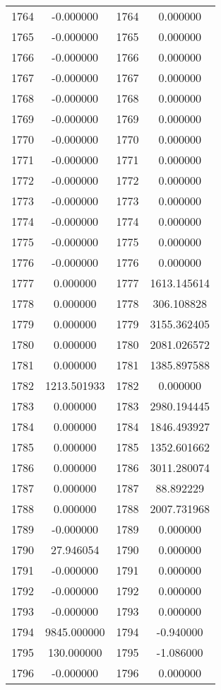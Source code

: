 \documentclass[12pt]{article}
\begin{document}
\begin{longtable}{@{}cccc@{}}
1764 & -0.000000 & 1764 & 0.000000 \\
1765 & -0.000000 & 1765 & 0.000000 \\
1766 & -0.000000 & 1766 & 0.000000 \\
1767 & -0.000000 & 1767 & 0.000000 \\
1768 & -0.000000 & 1768 & 0.000000 \\
1769 & -0.000000 & 1769 & 0.000000 \\
1770 & -0.000000 & 1770 & 0.000000 \\
1771 & -0.000000 & 1771 & 0.000000 \\
1772 & -0.000000 & 1772 & 0.000000 \\
1773 & -0.000000 & 1773 & 0.000000 \\
1774 & -0.000000 & 1774 & 0.000000 \\
1775 & -0.000000 & 1775 & 0.000000 \\
1776 & -0.000000 & 1776 & 0.000000 \\
1777 & 0.000000 & 1777 & 1613.145614 \\
1778 & 0.000000 & 1778 & 306.108828 \\
1779 & 0.000000 & 1779 & 3155.362405 \\
1780 & 0.000000 & 1780 & 2081.026572 \\
1781 & 0.000000 & 1781 & 1385.897588 \\
1782 & 1213.501933 & 1782 & 0.000000 \\
1783 & 0.000000 & 1783 & 2980.194445 \\
1784 & 0.000000 & 1784 & 1846.493927 \\
1785 & 0.000000 & 1785 & 1352.601662 \\
1786 & 0.000000 & 1786 & 3011.280074 \\
1787 & 0.000000 & 1787 & 88.892229 \\
1788 & 0.000000 & 1788 & 2007.731968 \\
1789 & -0.000000 & 1789 & 0.000000 \\
1790 & 27.946054 & 1790 & 0.000000 \\
1791 & -0.000000 & 1791 & 0.000000 \\
1792 & -0.000000 & 1792 & 0.000000 \\
1793 & -0.000000 & 1793 & 0.000000 \\
1794 & 9845.000000 & 1794 & -0.940000 \\
1795 & 130.000000 & 1795 & -1.086000 \\
1796 & -0.000000 & 1796 & 0.000000 \\

\end{longtable}
\end{document}
